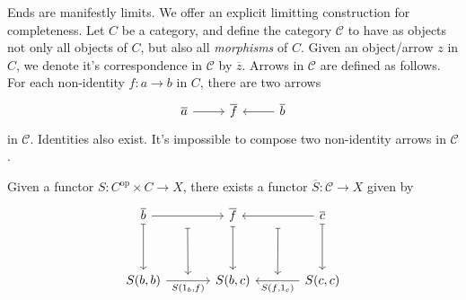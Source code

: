 Ends are manifestly limits. We offer an explicit limitting construction for completeness. Let $C$ be a category, and define the category $\mathcal{C} $ to have as objects not only all objects of $C$, but also all \emph{morphisms} of $C$. Given an object/arrow $z$ in $C$, we denote it's correspondence in $\mathcal{C} $ by $\overline{z} $. Arrows in $\mathcal{C} $ are defined as follows. For each non-identity $f : a \to b$ in $C$, there are two arrows
\[\begin{tikzcd}[row sep = 2.5em, column sep = 2.5em]
\overline{a} \ar[r]  & \overline{f}  & \overline{b}  \ar[l] 
\end{tikzcd}\]
in $\mathcal{C} $. Identities also exist. It's impossible to compose two non-identity arrows in $\mathcal{C} $.

Given a functor $S : C^{\mathrm{op} } \times C \to X$, there exists a functor $\overline{S} : \mathcal{C}  \to X$ given by
\[\begin{tikzcd}[row sep = 3.5em, column sep = 3.5em]
	\overline{b} \ar[""'{name=b}, r] \ar[mapsto, d]  & \overline{f} \ar[mapsto, d]  & \overline{c}  \ar[""{name=c}, l] \ar[mapsto, d]  \\
S(b,b)\ar[" S(1_b\text{,} f) "'{name=Sb}, r]  & S(b,c) & S(c,c)\ar[" S(f\text{,} 1_c) "{name=Sc}, l] 
\arrow[from=b, to=Sb, shorten=5pt, mapsto]
\arrow[from=c, to=Sc, shorten=5pt, mapsto]
\end{tikzcd}\]

